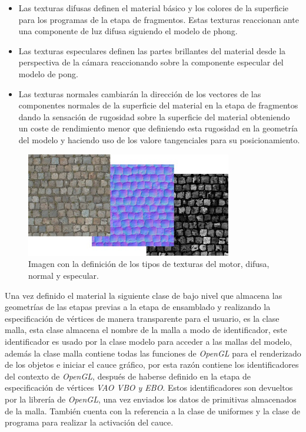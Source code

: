 \documentclass[a4paper]{book}
\begin{document}
\begin{itemize}

\item Las texturas difusas definen el material básico y los colores de la superficie para los programas de la etapa de fragmentos. Estas
texturas reaccionan ante una componente de luz difusa siguiendo el modelo de phong.

\item Las texturas especulares definen las partes brillantes del material desde la perspectiva de la cámara reaccionando sobre la componente
especular del modelo de pong.

\item Las texturas normales cambiarán la dirección de los vectores de las componentes normales de la superficie del material en la etapa de
fragmentos dando la sensación de rugosidad sobre la superficie del material obteniendo un coste de rendimiento menor que definiendo
esta rugosidad en la geometría del modelo y haciendo uso de los valore tangenciales para su posicionamiento.

\end{itemize}

\begin{figure}[H]
    \centering
    \includegraphics[width=9cm, keepaspectratio]{img/custom-textures.jpg}
    \caption{Imagen con la definición de los tipos de texturas del motor, difusa, normal y especular.}
    \label{custom_textures}
\end{figure}

Una vez definido el material la siguiente clase de bajo nivel que almacena las geometrías de las etapas previas a la etapa de ensamblado y
realizando la especificación de vértices de manera transparente para el usuario, es la clase malla, esta clase almacena el nombre de la malla a
modo de identificador, este identificador es usado por la clase modelo para acceder a las mallas del modelo, además la clase malla contiene
todas las funciones de \textit{OpenGL} para el renderizado de los objetos e iniciar el cauce gráfico, por esta razón contiene los
identificadores del contexto de \textit{OpenGL}, después de haberse definido en la etapa de especificación de vértices \textit{VAO VBO y EBO}. Estos
identificadores son devueltos por la librería de \textit{OpenGL}, una vez enviados los datos de primitivas almacenados de la malla. También cuenta
con la referencia a la clase de uniformes y la clase de programa para realizar la activación del cauce.
\end{document}

